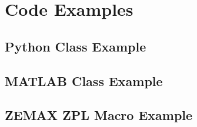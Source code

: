 \chapter{Code Examples}\label{chap:code_examples}

\section{Python Class Example}


\section{MATLAB Class Example}


\section{ZEMAX ZPL Macro Example}
